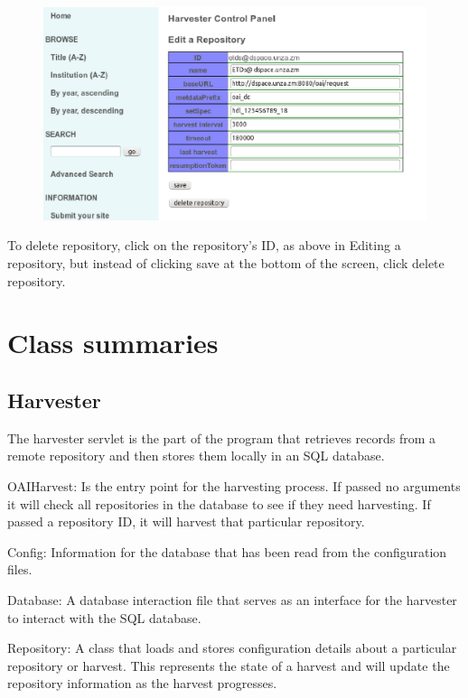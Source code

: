 \documentclass[a4paper,11pt]{article}
\begin{document}
\begin{figure}
 \centering
 \includegraphics[width=\textwidth]{deleting_repository_infomation_x.eps}
\end{figure}

To delete repository, click on the repository's ID, as above in Editing a repository, but instead of clicking save at the bottom of the screen, click delete repository.

\section{Class summaries}

\subsection{Harvester}

The harvester servlet is the part of the program that retrieves records from a remote repository and then stores them locally in an SQL database.

OAIHarvest: Is the entry point for the harvesting process. If passed no arguments it will check all repositories in the database to see if they need harvesting. If passed a repository ID, it will harvest that particular repository.

Config: Information for the database that has been read from the configuration files.

Database: A database interaction file that serves as an interface for the harvester to interact with the SQL database.

Repository: A class that loads and stores configuration details about a particular repository or harvest. This represents the state of a harvest and will update the repository information as the harvest progresses.
\end{document}
